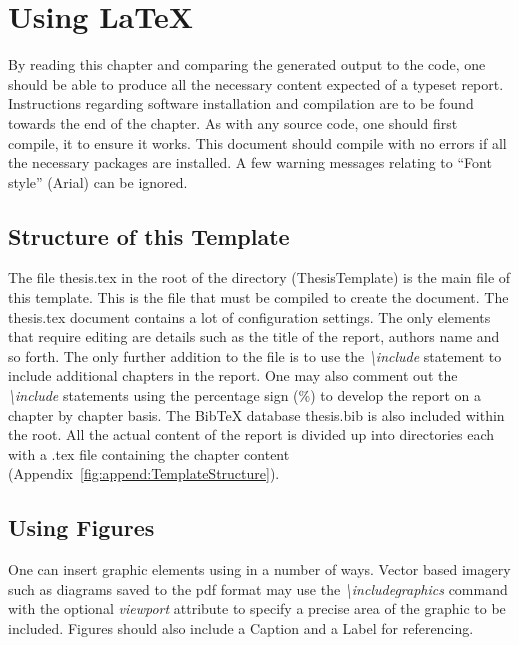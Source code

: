 \chapter{Using \LaTeX}\label{ch:usingLatex}

By reading this chapter and comparing the generated output to the \latex code, one should be able to produce all the necessary content expected of a typeset report. Instructions regarding software installation and compilation are to be found towards the end of the chapter. As with any source code, one should first compile, it to ensure it works. This document should compile with no errors if all the necessary packages are installed. A few warning messages relating to ``Font style'' (Arial) can be ignored. 

\section{Structure of this Template}

The file thesis.tex in the root of the directory (ThesisTemplate) is the main file of this template. This is the file that must be compiled to create the document. The thesis.tex document contains a lot of configuration settings. The only elements that require editing are details such as the title of the report, authors name and so forth. The only further addition to the file is to use the \emph{\textbackslash include} statement to include additional chapters in the report. One may also comment out the \emph{\textbackslash include} statements using the percentage sign (\%) to develop the report on a chapter by chapter basis. The BibTeX database thesis.bib is also included within the root. All the actual content of the report is divided up into directories each with a .tex file containing the chapter content (Appendix~\ref{fig:append:TemplateStructure}).



\section{Using Figures}

 One can insert graphic elements using \latex in a number of ways. Vector based imagery such as diagrams saved to the pdf format may use the \emph{\textbackslash includegraphics} command with the optional \emph{viewport} attribute to specify a precise area of the graphic to be included. Figures should also include a Caption and a Label for referencing.

